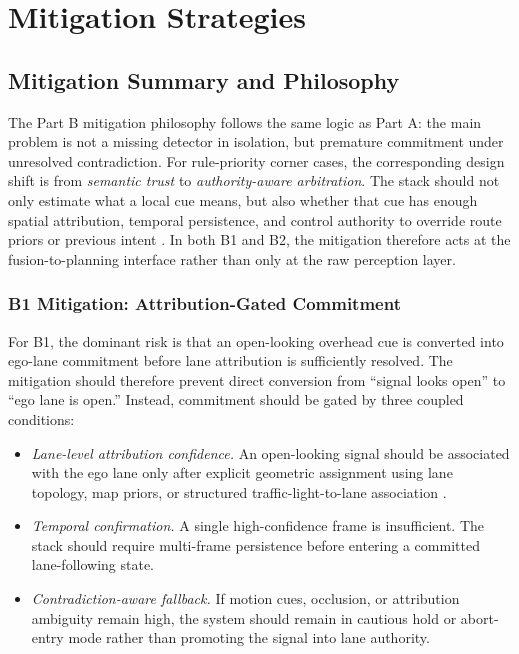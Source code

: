\documentclass[sigconf,nonacm]{acmart}
\begin{document}
\section{Mitigation Strategies}

\subsection{Mitigation Summary and Philosophy}

The Part B mitigation philosophy follows the same logic as Part A: the main problem is not a missing detector in isolation, but premature commitment under unresolved contradiction. For rule-priority corner cases, the corresponding design shift is from \emph{semantic trust} to \emph{authority-aware arbitration}. The stack should not only estimate what a local cue means, but also whether that cue has enough spatial attribution, temporal persistence, and control authority to override route priors or previous intent \cite{veer2022,shalev2017}. In both B1 and B2, the mitigation therefore acts at the fusion-to-planning interface rather than only at the raw perception layer.

\subsubsection{B1 Mitigation: Attribution-Gated Commitment}

For B1, the dominant risk is that an open-looking overhead cue is converted into ego-lane commitment before lane attribution is sufficiently resolved. The mitigation should therefore prevent direct conversion from ``signal looks open'' to ``ego lane is open.'' Instead, commitment should be gated by three coupled conditions:
\begin{itemize}
    \item \textit{Lane-level attribution confidence.} An open-looking signal should be associated with the ego lane only after explicit geometric assignment using lane topology, map priors, or structured traffic-light-to-lane association \cite{hirabayashi2019,monninger2023}.
    \item \textit{Temporal confirmation.} A single high-confidence frame is insufficient. The stack should require multi-frame persistence before entering a committed lane-following state.
    \item \textit{Contradiction-aware fallback.} If motion cues, occlusion, or attribution ambiguity remain high, the system should remain in cautious hold or abort-entry mode rather than promoting the signal into lane authority.
\end{itemize}
\end{document}
